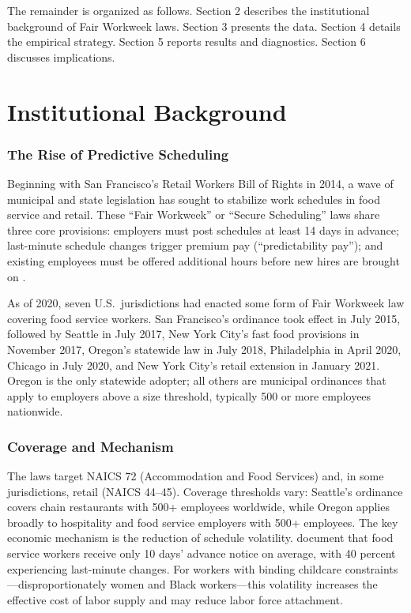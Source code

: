 \documentclass[12pt]{article}
\begin{document}
The remainder is organized as follows. Section 2 describes the institutional background of Fair Workweek laws. Section 3 presents the data. Section 4 details the empirical strategy. Section 5 reports results and diagnostics. Section 6 discusses implications.


\section{Institutional Background}

\subsubsection*{The Rise of Predictive Scheduling} Beginning with San Francisco's Retail Workers Bill of Rights in 2014, a wave of municipal and state legislation has sought to stabilize work schedules in food service and retail. These ``Fair Workweek'' or ``Secure Scheduling'' laws share three core provisions: employers must post schedules at least 14 days in advance; last-minute schedule changes trigger premium pay (``predictability pay''); and existing employees must be offered additional hours before new hires are brought on \citep{schneider2019}.

As of 2020, seven U.S.\ jurisdictions had enacted some form of Fair Workweek law covering food service workers. San Francisco's ordinance took effect in July 2015, followed by Seattle in July 2017, New York City's fast food provisions in November 2017, Oregon's statewide law in July 2018, Philadelphia in April 2020, Chicago in July 2020, and New York City's retail extension in January 2021. Oregon is the only statewide adopter; all others are municipal ordinances that apply to employers above a size threshold, typically 500 or more employees nationwide.

\subsubsection*{Coverage and Mechanism} The laws target NAICS 72 (Accommodation and Food Services) and, in some jurisdictions, retail (NAICS 44--45). Coverage thresholds vary: Seattle's ordinance covers chain restaurants with 500+ employees worldwide, while Oregon applies broadly to hospitality and food service employers with 500+ employees. The key economic mechanism is the reduction of schedule volatility. \citet{schneider2019} document that food service workers receive only 10 days' advance notice on average, with 40 percent experiencing last-minute changes. For workers with binding childcare constraints---disproportionately women and Black workers---this volatility increases the effective cost of labor supply and may reduce labor force attachment.
\end{document}
